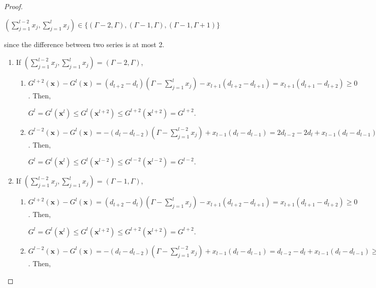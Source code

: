 \documentclass[letterpaper, 10pt]{article}
\renewcommand{\vec}[1]{\bm{#1}}
\begin{document}
\begin{proof}
	\begin{center}
		$\left( \sum\limits_{j=1}^{l-2}{x_{j}}, \sum\limits_{j=1}^{l}{x_{j}}  \right) \in \{ (\Gamma - 2, \Gamma), (\Gamma - 1, \Gamma), (\Gamma - 1, \Gamma + 1) \}$
	\end{center}
	since the difference between two series is at most 2.
	\begin{enumerate}
		\item If $\left( \sum\limits_{j=1}^{l-2}{x_{j}}, \sum\limits_{j=1}^{l}{x_{j}}  \right) = (\Gamma - 2, \Gamma)$,
		\begin{enumerate}
			\item $G^{l+2}(\vec{x}) - G^{l}(\vec{x}) = (d_{l+2} - d_{l}) \left( \Gamma - \sum\limits_{j=1}^{l}{x_{j}} \right) - x_{l+1}(d_{l+2} - d_{l+1}) = x_{l+1}(d_{l+1} - d_{l+2}) \ge 0$. Then,
			\begin{center}
				$G^{l} = G^{l}(\vec{x}^{l}) \le G^{l}(\vec{x}^{l+2}) \le G^{l+2}(\vec{x}^{l+2}) = G^{l+2}$.
			\end{center}
			\item $G^{l-2}(\vec{x}) - G^{l}(\vec{x}) = -(d_{l} - d_{l-2}) \left( \Gamma - \sum\limits_{j=1}^{l-2}{x_{j}} \right) + x_{l-1}(d_{l} - d_{l-1}) = 2d_{l-2} - 2d_{l} + x_{l-1}(d_{l} - d_{l-1}) \ge 2d_{l-2} - 2d_{l} + d_{l} - d_{l-1} = (d_{l-2} - d_{l-1}) + (d_{l-2} - d_{l}) \ge 0$. Then,
			\begin{center}
				$G^{l} = G^{l}(\vec{x}^{l}) \le G^{l}(\vec{x}^{l-2}) \le G^{l-2}(\vec{x}^{l-2}) = G^{l-2}$.
			\end{center}
		\end{enumerate}
		\item If $\left( \sum\limits_{j=1}^{l-2}{x_{j}}, \sum\limits_{j=1}^{l}{x_{j}}  \right) = (\Gamma - 1, \Gamma)$,
		\begin{enumerate}
			\item $G^{l+2}(\vec{x}) - G^{l}(\vec{x}) = (d_{l+2} - d_{l}) \left( \Gamma - \sum\limits_{j=1}^{l}{x_{j}} \right) - x_{l+1}(d_{l+2} - d_{l+1}) = x_{l+1}(d_{l+1} - d_{l+2}) \ge 0$. Then,
			\begin{center}
				$G^{l} = G^{l}(\vec{x}^{l}) \le G^{l}(\vec{x}^{l+2}) \le G^{l+2}(\vec{x}^{l+2}) = G^{l+2}$.
			\end{center}
			\item $G^{l-2}(\vec{x}) - G^{l}(\vec{x}) = -(d_{l} - d_{l-2}) \left( \Gamma - \sum\limits_{j=1}^{l-2}{x_{j}} \right) + x_{l-1}(d_{l} - d_{l-1}) =  d_{l-2} - d_{l} + x_{l-1}(d_{l} - d_{l-1}) \ge d_{l-2} - d_{l} + d_{l} - d_{l-1} = (d_{l-2} - d_{l-1}) \ge 0$. Then,
			\begin{center}

\end{center}
\end{enumerate}
\end{enumerate}
\end{proof}
\end{document}

